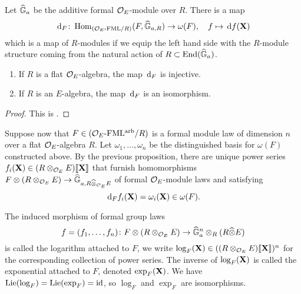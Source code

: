 \documentclass[../main.tex]{subfiles}
\begin{document}
Let $\widehat{\mathbb{G}}_a$ be the additive formal ${\mathcal{O}_E}$-module over $R$. There is a map
\begin{equation} \label{eq:functorinvdifftohom}
  \, \mathrm{d}_{F} \colon  \operatorname{Hom}_{{({\mathcal{O}_E}\textnormal-\allowbreak\mathrm{FML}/{R})}} ({F}, \widehat{\mathbb{G}}_{a,R}) \to \omega({F}), \quad f \mapsto \, \mathrm{d} f(\mathbf{X})
\end{equation}
which is a map of $R$-modules if we equip the left hand side with the $R$-module
structure coming from the natural action of $R \subset \operatorname{End}(\widehat{\mathbb{G}}_a)$. 
\begin{prop}\label{prop:loginvdiff}
  \begin{enumerate}
    \item If $R$ is a flat ${\mathcal{O}_E}$-algebra, the map $\, \mathrm{d}_F$ is injective.
    \item If $R$ is an $E$-algebra, the map $\, \mathrm{d}_F$ is an isomorphism.
  \end{enumerate}
\begin{proof}
  This is \cite[Proposition 3.2]{hopkins1994equivariant}.
\end{proof}
\end{prop}

Suppose now that $F \in {({\mathcal{O}_E}\textnormal-\allowbreak\mathrm{FML^{arb}}/{R})}$ is a formal module law of dimension $n$
over a flat ${\mathcal{O}_E}$-algebra $R$. 
Let $\omega_1, \dots, \omega_n$ be the distinguished basis for $\omega(F)$
constructed above. 
By the previous proposition, there are unique power series 
$f_i(\mathbf{X}) \in (R \otimes_{\mathcal{O}_E} E)\llbracket \mathbf{X} \rrbracket$ that furnish homomorphisms
$F \otimes (R \otimes_{\mathcal{O}_E} E) \to \widehat{\mathbb{G}}_{a,R\widehat \otimes_{\mathcal{O}_E}E}$ of formal
${\mathcal{O}_E}$-module laws
and satisfying
\begin{equation*}
  \, \mathrm{d}_F f_i(\mathbf{X}) = \omega_i(\mathbf{X}) \in \omega(F).
\end{equation*}
\begin{defi}
  The induced morphism of formal group laws
  \begin{equation*}
    f = (f_1, \dots, f_n) \colon  F \otimes (R \otimes_{\mathcal{O}_E} E) \to \widehat{\mathbb{G}}_a^n \otimes_R (R \widehat \otimes E)
  \end{equation*}
  is called the logarithm attached to $F$, we write 
  $\log_F(\mathbf{X}) \in ((R \otimes_{\mathcal{O}_E} E)\llbracket \mathbf{X} \rrbracket)^n$ for the corresponding collection
  of power series. The inverse of $\log_F(\mathbf{X})$ is called the exponential 
  attached to $F$, denoted $\exp_F(\mathbf{X})$. We have $\operatorname{Lie}(\log_F) = \operatorname{Lie}(\exp_F) = \operatorname{id}$,
  so $\log_F$ and $\exp_F$ are isomorphisms.
\end{defi}
\end{document}

